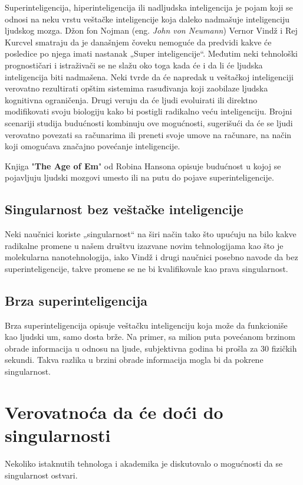 \documentclass[a4paper]{article}
\begin{document}
Superinteligencija, hiperinteligencija ili nadljudska inteligencija je pojam koji se odnosi na neku vrstu veštačke inteligencije koja daleko nadmašuje inteligenciju ljudskog mozga. Džon fon Nojman (eng. \textit{John von Neumann}) Vernor Vindž i Rej Kurcvel smatraju da je današnjem čoveku nemoguće da predvidi kakve će posledice po njega imati nastanak „Super inteligencije“.
Međutim neki tehnološki prognostičari i istraživači se ne slažu oko toga kada će i da li će ljudska inteligencija biti nadmašena.  Neki tvrde da će napredak u veštačkoj inteligenciji verovatno rezultirati opštim sistemima rasuđivanja koji zaobilaze ljudska kognitivna ograničenja. Drugi veruju da će ljudi evoluirati ili direktno modifikovati svoju biologiju kako bi postigli radikalno veću inteligenciju.\cite{ref 3}
Brojni scenariji studija budućnosti kombinuju ove mogućnosti, sugerišući da će se ljudi verovatno povezati sa računarima ili preneti svoje umove na računare, na način koji omogućava značajno povećanje inteligencije.

Knjiga "\textbf{The Age of Em}" od Robina Hansona opisuje budućnost u kojoj se pojavljuju ljudski mozgovi umesto ili na putu do pojave superinteligencije.

\subsection{Singularnost bez veštačke inteligencije}

Neki naučnici koriste „singularnost“ na širi način tako što upućuju na bilo kakve radikalne promene u našem društvu izazvane novim tehnologijama kao što je molekularna nanotehnologija,\cite{ref 4} iako Vindž i drugi naučnici posebno navode da bez superinteligencije, takve promene se ne bi kvalifikovale kao prava singularnost.

\subsection{Brza superinteligencija}
Brza superinteligencija opisuje veštačku inteligenciju koja može da funkcioniše kao ljudski um, samo dosta brže. Na primer, sa milion puta povećanom brzinom obrade informacija u odnosu na ljude, subjektivna godina bi prošla za 30 fizičkih sekundi. Takva razlika u brzini obrade informacija mogla bi da pokrene singularnost.

\section{Verovatnoća da će doći do singularnosti}	
\label{sec:verovatnoća}
Nekoliko istaknutih tehnologa i akademika je diskutovalo o mogućnosti da se singularnost ostvari. 
\end{document}

